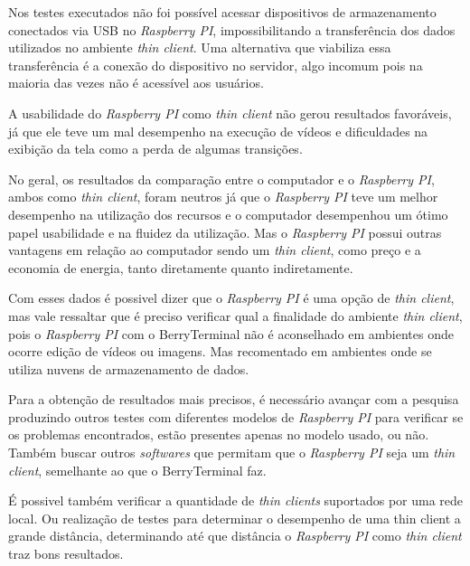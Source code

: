 \documentclass[
	12pt,				%
	openright,			%
	twoside,			%
	a4paper,			%
	chapter=TITLE,		%
	english,			%
	brazil				%
	]{abntex2}
\begin{document}
Nos testes executados não foi possível acessar dispositivos de armazenamento conectados via USB no \textit{Raspberry PI}, impossibilitando a transferência dos dados utilizados no ambiente \textit{thin client}. Uma alternativa que viabiliza essa transferência é a conexão do dispositivo no servidor, algo incomum pois na maioria das vezes não é acessível aos usuários.

A usabilidade do \textit{Raspberry PI} como \textit{thin client} não gerou resultados favoráveis, já que ele teve um mal desempenho na execução de vídeos e dificuldades na exibição da tela como a perda de algumas transições.

No geral, os resultados da comparação entre o computador e o \textit{Raspberry PI}, ambos como \textit{thin client}, foram neutros já que o \textit{Raspberry PI} teve um melhor desempenho na utilização dos recursos e o computador desempenhou um ótimo papel usabilidade e na fluidez da utilização. Mas o \textit{Raspberry PI} possui outras vantagens em relação ao computador sendo um \textit{thin client}, como preço e a economia de energia, tanto diretamente quanto indiretamente.

Com esses dados é possivel dizer que o \textit{Raspberry PI} é uma opção de \textit{thin client}, mas vale ressaltar que é preciso verificar qual a finalidade do ambiente \textit{thin client}, pois o \textit{Raspberry PI} com o BerryTerminal não é aconselhado em ambientes onde ocorre edição de vídeos ou imagens. Mas recomentado em ambientes onde se utiliza nuvens de armazenamento de dados.

Para a obtenção de resultados mais precisos, é necessário avançar com a pesquisa produzindo outros testes com diferentes modelos de \textit{Raspberry PI} para verificar se os problemas encontrados, estão presentes apenas no modelo usado, ou não. Também buscar outros \textit{softwares} que permitam que o \textit{Raspberry PI} seja um \textit{thin client}, semelhante ao que o BerryTerminal faz.

É possivel também verificar a quantidade de \textit{thin clients} suportados por uma rede local. Ou realização de testes para determinar o desempenho de uma thin client a grande distância, determinando até que distância o \textit{Raspberry PI} como \textit{thin client} traz bons resultados.  





\end{document}
